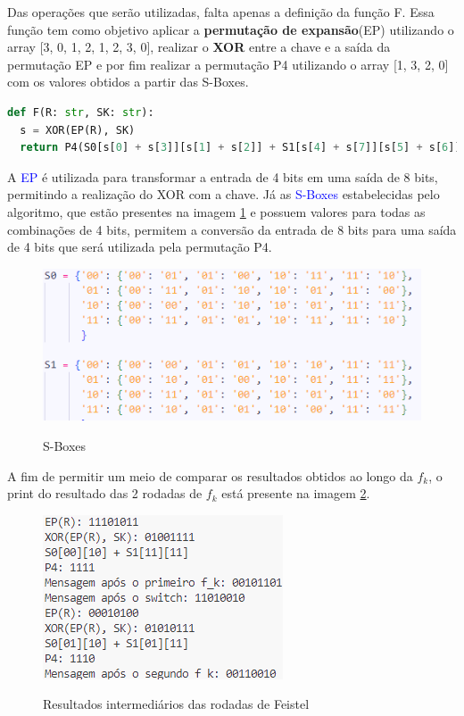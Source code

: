 \documentclass[12pt]{article}
\newcommand{\blue}[1]{\textcolor{blue}{#1}}
\begin{document}
Das operações que serão utilizadas, falta apenas a definição da função F. Essa função tem como objetivo aplicar a \textbf{permutação de expansão}(EP) utilizando o array [3, 0, 1, 2, 1, 2, 3, 0], realizar o \textbf{XOR} entre a chave e a saída da permutação EP e por fim realizar a permutação P4 utilizando o array [1, 3, 2, 0] com os valores obtidos a partir das S-Boxes.

\begin{lstlisting}[language=Python, caption={Função F}]
def F(R: str, SK: str):
  s = XOR(EP(R), SK)
  return P4(S0[s[0] + s[3]][s[1] + s[2]] + S1[s[4] + s[7]][s[5] + s[6]])
\end{lstlisting}

A \blue{EP} é utilizada para transformar a entrada de 4 bits em uma saída de 8 bits, permitindo a realização do XOR com a chave. Já as \blue{S-Boxes} estabelecidas pelo algoritmo, que estão presentes na imagem \ref{fig:S-Boxes} e possuem valores para todas as combinações de 4 bits, permitem a conversão da entrada de 8 bits para uma saída	de 4 bits que será utilizada pela permutação P4.

\begin{figure}[h]
    \caption{S-Boxes}
    \centering
    \includegraphics[width = 0.8\linewidth]{Imagens/S-Boxes.png}  
    \label{fig:S-Boxes}
\end{figure}

A fim de permitir um meio de comparar os resultados obtidos ao longo da $f_{k}$, o print do resultado das 2 rodadas de $f_{k}$ está presente na imagem \ref{fig:Feistel}.
\begin{figure}[h]
    \caption{Resultados intermediários das rodadas de Feistel}
    \centering
    \includegraphics[width = 0.4\linewidth]{Imagens/Feistel.png}  
    \label{fig:Feistel}
\end{figure}
\end{document}
